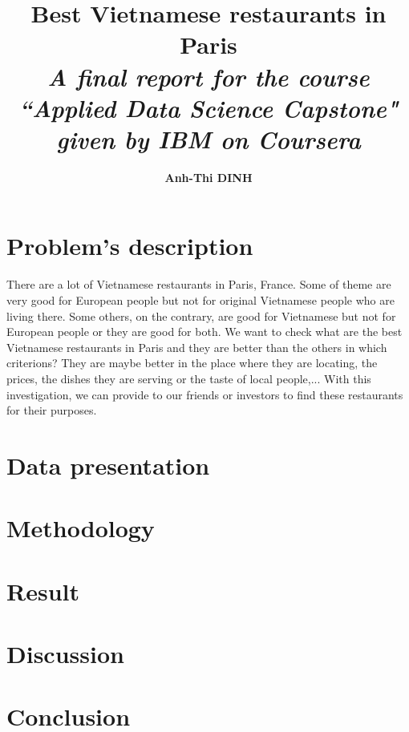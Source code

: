 \documentclass[12pt,a4paper]{article}
\author{\textbf{Anh-Thi DINH}}
\title{\textbf{Best Vietnamese restaurants in Paris}\\{\normalsize \textit{A final report for the course ``Applied Data Science Capstone" given by IBM on Coursera}}}
\begin{document}
\maketitle

\section{Problem's description}

There are a lot of Vietnamese restaurants in Paris, France. Some of theme are very good for European people but not for original Vietnamese people who are living there. Some others, on the contrary, are good for Vietnamese but not for European people or they are good for both. We want to check what are the best Vietnamese restaurants in Paris and they are better than the others in which criterions? They are maybe better in the place where they are locating, the prices, the dishes they are serving or the taste of local people,... With this investigation, we can provide to our friends or investors to find these restaurants for their purposes.

\section{Data presentation}

\section{Methodology}

\section{Result}

\section{Discussion}

\section{Conclusion}
\end{document}
